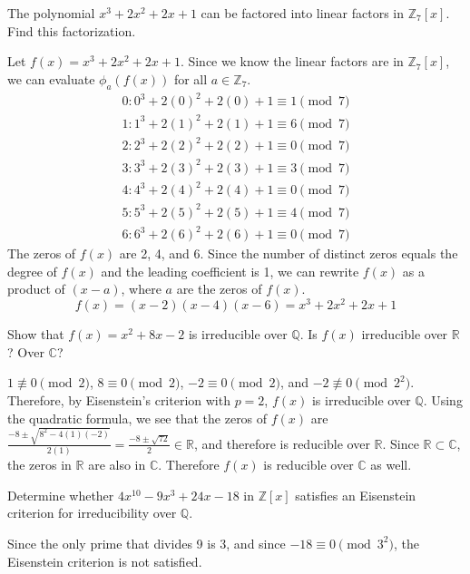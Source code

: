 \documentclass[11pt]{article}
\begin{document}
\begin{problem}[23.10]
    The polynomial $x^3 + 2x^2 + 2x + 1$ can be factored into linear factors in $\mathbb{Z}_7[x]$. Find this factorization.
\end{problem}
\begin{solution}
    Let $f(x) = x^3 + 2x^2 + 2x + 1$. Since we know the linear factors are in $\mathbb{Z}_7[x]$, we can evaluate $\phi_a(f(x))$ for all $a \in \mathbb{Z}_7$.
    \begin{align*}
        0: 0^3 + 2(0)^2 + 2(0) + 1 \equiv 1 \pmod{7}\\
        1: 1^3 + 2(1)^2 + 2(1) + 1 \equiv 6 \pmod{7}\\
        2: 2^3 + 2(2)^2 + 2(2) + 1 \equiv 0 \pmod{7}\\
        3: 3^3 + 2(3)^2 + 2(3) + 1 \equiv 3 \pmod{7}\\
        4: 4^3 + 2(4)^2 + 2(4) + 1 \equiv 0 \pmod{7}\\
        5: 5^3 + 2(5)^2 + 2(5) + 1 \equiv 4 \pmod{7}\\
        6: 6^3 + 2(6)^2 + 2(6) + 1 \equiv 0 \pmod{7}
    \end{align*}
    The zeros of $f(x)$ are 2, 4, and 6. Since the number of distinct zeros equals the degree of $f(x)$ and the leading coefficient is 1, we can rewrite $f(x)$ as a product of $(x-a)$, where $a$ are the zeros of $f(x)$.
    \[
    \boxed{f(x) = (x-2)(x-4)(x-6) = x^3 + 2x^2 + 2x + 1}
    \]
\end{solution}
\begin{problem}[23.14]
    Show that $f(x) = x^2 + 8x - 2$ is irreducible over $\mathbb{Q}$. Is $f(x)$ irreducible over $\mathbb{R}$? Over $\mathbb{C}$?
\end{problem}

\begin{solution}
    $1 \not\equiv 0 \pmod{2}$, $8 \equiv 0 \pmod{2}$, $-2 \equiv 0 \pmod{2}$, and $-2 \not\equiv 0 \pmod{2^2}$. Therefore, by Eisenstein's criterion with $p = 2$, $f(x)$ is irreducible over $\mathbb{Q}$. 
    Using the quadratic formula, we see that the zeros of $f(x)$ are $\frac{-8 \pm \sqrt{8^2-4(1)(-2)}}{2(1)} = \frac{-8 \pm \sqrt{72}}{2} \in \mathbb{R}$, and therefore is reducible over $\mathbb{R}$.
    Since $\mathbb{R} \subset \mathbb{C}$, the zeros in $\mathbb{R}$ are also in $\mathbb{C}$. Therefore $f(x)$ is reducible over $\mathbb{C}$ as well.
\end{solution}

\begin{problem}[23.20]
    Determine whether $4x^{10} - 9x^3 + 24x -18$ in $\mathbb{Z}[x]$ satisfies an Eisenstein criterion for irreducibility over $\mathbb{Q}$.
\end{problem}

\begin{solution}
    Since the only prime that divides 9 is 3, and since $-18 \equiv 0 \pmod{3^2}$, the Eisenstein criterion is not satisfied.
\end{solution}
\end{document}
